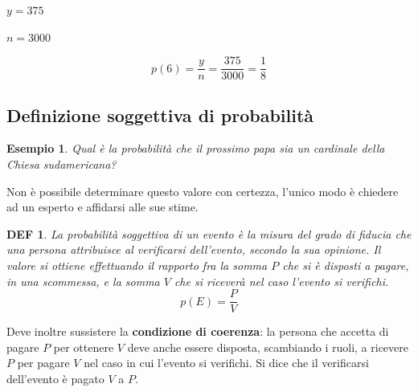 \documentclass{article}     %
\newtheorem*{definition}{DEF}
\newtheorem{ex}{Esempio}[section]
\begin{document}
                    $y=375$

                    $n=3000$

                    \[p(6)=\frac{y}{n}=\frac{375}{3000}=\frac{1}{8}\]
                \subsection{Definizione soggettiva di probabilità}
                    \begin{ex}
                        Qual è la probabilità che il prossimo papa sia un cardinale della Chiesa sudamericana?
                    \end{ex}
                    Non è possibile determinare questo valore con certezza, l'unico modo è chiedere ad un esperto e affidarsi alle sue stime. 

                    \begin{definition}
                        La probabilità soggettiva di un evento è la misura del grado di fiducia che una persona attribuisce al verificarsi dell'evento, secondo la sua opinione. Il valore si ottiene effettuando il rapporto fra la somma $P$ che si è disposti a pagare, in una scommessa, e la somma $V$ che si riceverà nel caso l'evento si verifichi.
                        \[p(E)=\frac{P}{V}\]
                    \end{definition}
                    Deve inoltre sussistere la \textbf{condizione di coerenza}: la persona che accetta di pagare $P$ per ottenere $V$ deve anche essere disposta, scambiando i ruoli, a ricevere $P$ per pagare $V$ nel caso in cui l'evento si verifichi. Si dice che il verificarsi dell'evento è pagato $V$ a $P$.
\end{document}
